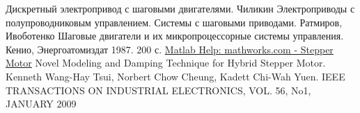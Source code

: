 \newpage
\begin{thebibliography}{20}
     Дискретный электропривод с шаговыми двигателями. Чиликин
     Электроприводы с полупроводниковым управлением. Системы с шаговыми приводами. Ратмиров, Ивоботенко
     Шаговые двигатели и их микропроцессорные системы управления. Кенио, Энергоатомиздат 1987. 200 с.
     \href{http://www.mathworks.com/help/physmod/sps/powersys/ref/steppermotor.html}{Matlab Help: mathworks.com - Stepper Motor}
     Novel Modeling and Damping Technique for Hybrid Stepper Motor.
                                            Kenneth Wang-Hay Tsui, Norbert Chow Cheung, Kadett Chi-Wah Yuen.
                                            IEEE TRANSACTIONS ON INDUSTRIAL ELECTRONICS, VOL. 56, No1, JANUARY 2009
\end{thebibliography}

\endinput

